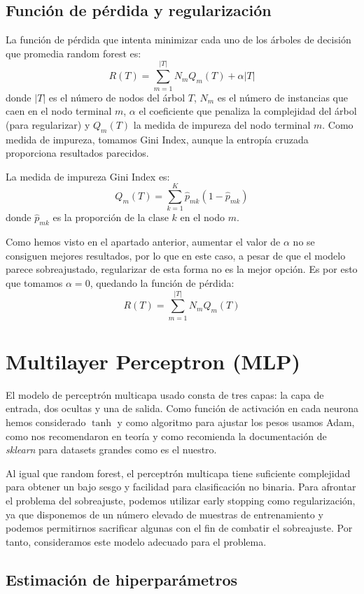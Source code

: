 \documentclass[a4]{article}
\begin{document}
\subsection{Función de pérdida y regularización}

La función de pérdida que intenta minimizar cada uno de los árboles de
decisión que promedia random forest es:
\[R(T) = \sum\limits_{m=1}^{|T|} N_mQ_m(T) + \alpha|T|\] donde $|T|$ es el número de nodos del árbol $T$, $N_m$ es el número de instancias que caen en el nodo terminal $m$, $\alpha$ el coeficiente que penaliza la complejidad del árbol (para regularizar) y $Q_m(T)$ la medida de impureza del nodo terminal $m$. Como medida de impureza, tomamos Gini Index, aunque la entropía cruzada proporciona resultados parecidos.

La medida de impureza Gini Index es:
\[Q_m(T) = \sum\limits_{k=1}^{K} \hat p_{mk}(1 - \hat p_{mk})\] donde
$\hat p_{mk}$ es la proporción de la clase $k$ en el nodo $m$.

Como hemos visto en el apartado anterior, aumentar el valor de $\alpha$ no se consiguen mejores resultados, por lo que en este caso, a pesar de que el modelo parece sobreajustado, regularizar de esta forma no es la mejor opción. Es por esto que tomamos $\alpha = 0$, quedando la función de pérdida:
\[R(T) = \sum\limits_{m=1}^{|T|} N_mQ_m(T)\]

\section{Multilayer Perceptron (MLP)}

El modelo de perceptrón multicapa usado consta de tres capas: la capa
de entrada, dos ocultas y una de salida. Como función de activación en
cada neurona hemos considerado $\tanh$ y como algoritmo para ajustar
los pesos usamos Adam, como nos recomendaron en teoría y como
recomienda la documentación de \textit{sklearn} para datasets grandes
como es el nuestro.

Al igual que random forest, el perceptrón multicapa tiene suficiente
complejidad para obtener un bajo sesgo y facilidad para clasificación
no binaria. Para afrontar el problema del sobreajuste, podemos
utilizar early stopping como regularización, ya que disponemos de un
número elevado de muestras de entrenamiento y podemos permitirnos
sacrificar algunas con el fin de combatir el sobreajuste. Por tanto,
consideramos este modelo adecuado para el problema.

\subsection{Estimación de hiperparámetros}
\end{document}
